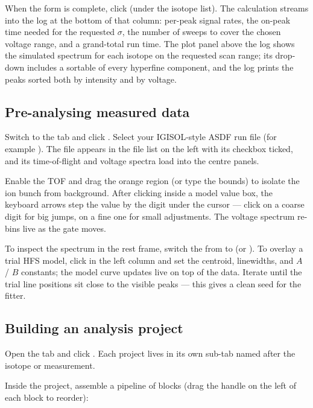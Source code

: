 When the form is complete, click  (under the isotope
list). The calculation streams into the log at the bottom of that
column: per-peak signal rates, the on-peak time needed for the
requested $\sigma$, the number of sweeps to cover the chosen voltage
range, and a grand-total run time. The plot panel above the log
shows the simulated spectrum for each isotope on the requested scan
range; its  drop-down includes a sortable 
of every hyperfine component, and the log prints the peaks sorted
both by intensity and by voltage.

\subsection{Pre-analysing measured data}

Switch to the  tab and click .
Select your IGISOL-style ASDF run file (for example
). The file appears in the
file list on the left with its checkbox ticked, and its
time-of-flight and voltage spectra load into the centre panels.

Enable the TOF  and drag the orange region (or type the
bounds) to isolate the ion bunch from background. After clicking
inside a model value box, the keyboard arrows step the value by the
digit under the cursor --- click on a coarse digit for big jumps, on
a fine one for small adjustments. The voltage spectrum re-bins live
as the gate moves.

To inspect the spectrum in the rest frame, switch the 
from  to  (or ). To
overlay a trial HFS model, click  in the left
column and set the centroid, linewidths, and $A$ / $B$ constants;
the model curve updates live on top of the data. Iterate until the
trial line positions sit close to the visible peaks --- this gives a
clean seed for the fitter.

\subsection{Building an analysis project}

Open the  tab and click . Each project lives in its own sub-tab named after the
isotope or measurement.

Inside the project, assemble a pipeline of blocks (drag the handle on
the left of each block to reorder):

